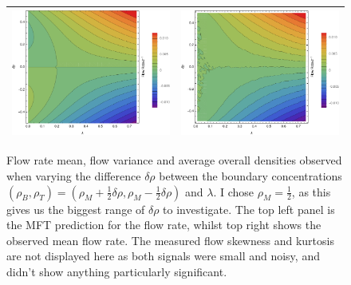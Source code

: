 \begin{figure}[h!]
\vspace{1em}
\caption{\label{fig:constDens} Flow rate mean, flow variance and average overall densities observed when varying the difference $\delta\rho$ between the boundary concentrations
$(\rho_B, \rho_T) = (\rho_M + \frac{1}{2} \delta\rho, \rho_M - \frac{1}{2} \delta\rho)$ and $\lambda$. I chose $\rho_M=\frac{1}{2}$, as this gives us the biggest range of $\delta\rho$ to investigate. The top left panel is the MFT prediction
for the flow rate, whilst top right shows the observed mean flow rate. The measured flow skewness and kurtosis are not displayed here as both signals were small and noisy, and didn't show anything particularly significant.}
\begin{center}
 \begin{tabular}{c|c}
    \includegraphics[width=0.5\linewidth]{../tex-src/images/constDens/constAnalFlow-crop} & \includegraphics[width=0.5\linewidth]{../tex-src/images/constDens/meanFlowContour-crop} \\
    \hline

\end{tabular}
\end{center}
\end{figure}
